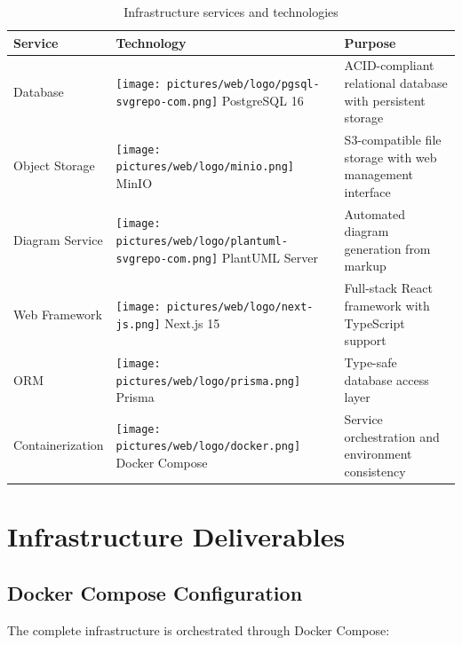 \begin{table}[H]
    \centering
    \begin{tabular}{|p{3cm}|p{4cm}|p{6cm}|}
        \hline
        \textbf{Service} & \textbf{Technology} & \textbf{Purpose} \\ \hline
        
        Database &\texttt{[image: pictures/web/logo/pgsql-svgrepo-com.png]}  PostgreSQL 16 & ACID-compliant relational database with persistent storage \\ \hline
        
        Object Storage & \texttt{[image: pictures/web/logo/minio.png]}  MinIO & S3-compatible file storage with web management interface \\ \hline
        
        Diagram Service & \texttt{[image: pictures/web/logo/plantuml-svgrepo-com.png]}  PlantUML Server & Automated diagram generation from markup \\ \hline
        
        Web Framework & \texttt{[image: pictures/web/logo/next-js.png]}  Next.js 15 & Full-stack React framework with TypeScript support \\ \hline
        
        ORM &\texttt{[image: pictures/web/logo/prisma.png]}  Prisma & Type-safe database access layer \\ \hline
        
        Containerization & \texttt{[image: pictures/web/logo/docker.png]}  Docker Compose & Service orchestration and environment consistency \\ \hline
    \end{tabular}
    \caption{Infrastructure services and technologies}
\end{table}

\section{Infrastructure Deliverables}

\subsection{Docker Compose Configuration}

The complete infrastructure is orchestrated through Docker Compose:

